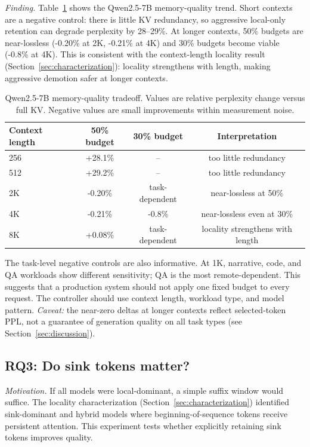 \documentclass[11pt]{article}
\newcommand{\pct}{\%}
\theoremstyle{definition}
\theoremstyle{plain}
\begin{document}
\emph{Finding.}  Table~\ref{tab:qwen-pareto} shows the Qwen2.5-7B memory-quality trend.  Short contexts are a negative control: there is little KV redundancy, so aggressive local-only retention can degrade perplexity by 28--29\pct{}.  At longer contexts, 50\pct{} budgets are near-lossless (-0.20\pct{} at 2K, -0.21\pct{} at 4K) and 30\pct{} budgets become viable (-0.8\pct{} at 4K).  This is consistent with the context-length locality result (Section~\ref{sec:characterization}): locality strengthens with length, making aggressive demotion safer at longer contexts.

\begin{table}[t]
\centering
\caption{Qwen2.5-7B memory-quality tradeoff.  Values are relative perplexity change versus full KV.  Negative values are small improvements within measurement noise.}
\label{tab:qwen-pareto}
\small
\begin{tabular}{lccc}
\toprule
Context length & 50\pct{} budget & 30\pct{} budget & Interpretation \\
\midrule
256 & +28.1\pct{} & -- & too little redundancy \\
512 & +29.2\pct{} & -- & too little redundancy \\
2K & -0.20\pct{} & task-dependent & near-lossless at 50\pct{} \\
4K & -0.21\pct{} & -0.8\pct{} & near-lossless even at 30\pct{} \\
8K & +0.08\pct{} & task-dependent & locality strengthens with length \\
\bottomrule
\end{tabular}
\end{table}

The task-level negative controls are also informative.  At 1K, narrative, code, and QA workloads show different sensitivity; QA is the most remote-dependent.  This suggests that a production system should not apply one fixed budget to every request.  The controller should use context length, workload type, and model pattern.  \emph{Caveat:} the near-zero deltas at longer contexts reflect selected-token PPL, not a guarantee of generation quality on all task types (see Section~\ref{sec:discussion}).

\subsection{RQ3: Do sink tokens matter?}
\label{sec:rq3}

\emph{Motivation.}  If all models were local-dominant, a simple suffix window would suffice.  The locality characterization (Section~\ref{sec:characterization}) identified sink-dominant and hybrid models where beginning-of-sequence tokens receive persistent attention.  This experiment tests whether explicitly retaining sink tokens improves quality.
\end{document}
